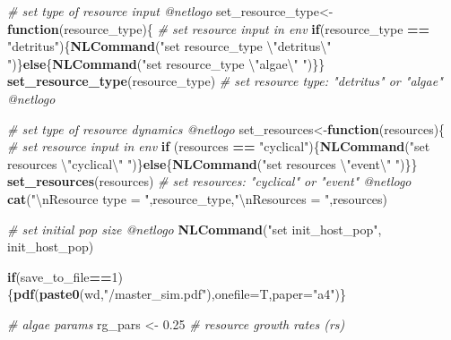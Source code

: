 \documentclass[10,portrait]{article}
\newenvironment{Shaded}{\begin{snugshade}}{\end{snugshade}}
\newcommand{\KeywordTok}[1]{\textcolor[rgb]{0.13,0.29,0.53}{\textbf{#1}}}
\newcommand{\DataTypeTok}[1]{\textcolor[rgb]{0.13,0.29,0.53}{#1}}
\newcommand{\DecValTok}[1]{\textcolor[rgb]{0.00,0.00,0.81}{#1}}
\newcommand{\FloatTok}[1]{\textcolor[rgb]{0.00,0.00,0.81}{#1}}
\newcommand{\CharTok}[1]{\textcolor[rgb]{0.31,0.60,0.02}{#1}}
\newcommand{\StringTok}[1]{\textcolor[rgb]{0.31,0.60,0.02}{#1}}
\newcommand{\CommentTok}[1]{\textcolor[rgb]{0.56,0.35,0.01}{\textit{#1}}}
\newcommand{\ControlFlowTok}[1]{\textcolor[rgb]{0.13,0.29,0.53}{\textbf{#1}}}
\newcommand{\OperatorTok}[1]{\textcolor[rgb]{0.81,0.36,0.00}{\textbf{#1}}}
\newcommand{\NormalTok}[1]{#1}
\begin{document}
\begin{Shaded}
\begin{Highlighting}[]
{{        \CommentTok{# set type of resource input @netlogo}
\NormalTok{        set_resource_type<-}\ControlFlowTok{function}\NormalTok{(resource_type)\{ }\CommentTok{# set resource input in env  }
          \ControlFlowTok{if}\NormalTok{(resource_type }\OperatorTok{==}\StringTok{ "detritus"}\NormalTok{)\{}\KeywordTok{NLCommand}\NormalTok{(}\StringTok{"set resource_type }\CharTok{\textbackslash{}"}\StringTok{detritus}\CharTok{\textbackslash{}"}\StringTok{ "}\NormalTok{)\}}\ControlFlowTok{else}\NormalTok{\{}\KeywordTok{NLCommand}\NormalTok{(}\StringTok{"set resource_type }\CharTok{\textbackslash{}"}\StringTok{algae}\CharTok{\textbackslash{}"}\StringTok{ "}\NormalTok{)\}\}}
        \KeywordTok{set_resource_type}\NormalTok{(resource_type) }\CommentTok{# set resource type: "detritus" or "algae"  @netlogo}
        
        \CommentTok{# set type of resource dynamics @netlogo}
\NormalTok{        set_resources<-}\ControlFlowTok{function}\NormalTok{(resources)\{ }\CommentTok{# set resource input in env  }
          \ControlFlowTok{if}\NormalTok{ (resources }\OperatorTok{==}\StringTok{ "cyclical"}\NormalTok{)\{}\KeywordTok{NLCommand}\NormalTok{(}\StringTok{"set resources }\CharTok{\textbackslash{}"}\StringTok{cyclical}\CharTok{\textbackslash{}"}\StringTok{ "}\NormalTok{)\}}\ControlFlowTok{else}\NormalTok{\{}\KeywordTok{NLCommand}\NormalTok{(}\StringTok{"set resources }\CharTok{\textbackslash{}"}\StringTok{event}\CharTok{\textbackslash{}"}\StringTok{ "}\NormalTok{)\}\}}
        \KeywordTok{set_resources}\NormalTok{(resources) }\CommentTok{# set resources: "cyclical" or "event"  @netlogo}
        \KeywordTok{cat}\NormalTok{(}\StringTok{"}\CharTok{\textbackslash{}n}\StringTok{Resource type = "}\NormalTok{,resource_type,}\StringTok{"}\CharTok{\textbackslash{}n}\StringTok{Resources = "}\NormalTok{,resources)}
        
        \CommentTok{# set initial pop size @netlogo}
        \KeywordTok{NLCommand}\NormalTok{(}\StringTok{"set init_host_pop"}\NormalTok{, init_host_pop)}
        
        \ControlFlowTok{if}\NormalTok{(save_to_file}\OperatorTok{==}\DecValTok{1}\NormalTok{)\{}\KeywordTok{pdf}\NormalTok{(}\KeywordTok{paste0}\NormalTok{(wd,}\StringTok{"/master_sim.pdf"}\NormalTok{),}\DataTypeTok{onefile=}\NormalTok{T,}\DataTypeTok{paper=}\StringTok{"a4"}\NormalTok{)\}}
          
          \CommentTok{# algae params}
\NormalTok{          rg_pars <-}\StringTok{ }\FloatTok{0.25} \CommentTok{# resource growth rates (rs)}
          
}}
\end{Highlighting}
\end{Shaded}
\end{document}
